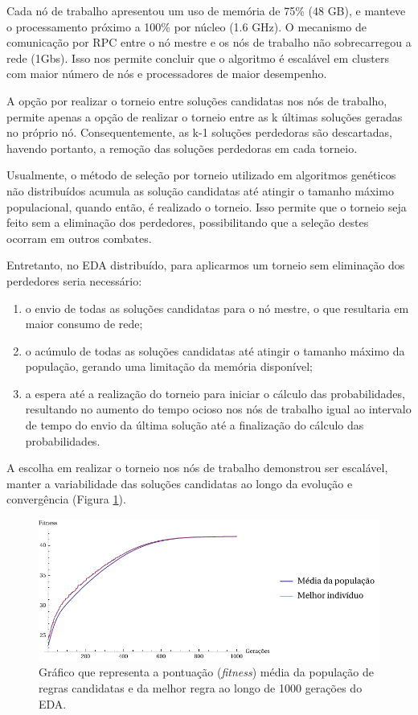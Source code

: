 Cada nó de trabalho apresentou um uso de memória de 75\% (48 GB), e manteve o processamento próximo a 100\% por núcleo (1.6 GHz). O mecanismo de comunicação por RPC entre o nó mestre e os nós de trabalho não sobrecarregou a rede (1Gbs). Isso nos permite concluir que o algoritmo é escalável em clusters com maior número de nós e processadores de maior desempenho.

A opção por realizar o torneio entre soluções candidatas nos nós de trabalho, permite apenas a opção de realizar o torneio entre as k últimas soluções geradas no próprio nó. Consequentemente, as k-1 soluções perdedoras são descartadas, havendo portanto, a remoção das soluções perdedoras em cada torneio. 

Usualmente, o método de seleção por torneio utilizado em algoritmos genéticos não distribuídos acumula as solução candidatas até atingir o tamanho máximo populacional, quando então, é realizado o torneio. Isso permite que o torneio seja feito sem a eliminação dos perdedores, possibilitando que a seleção destes ocorram em outros combates.

Entretanto, no EDA distribuído, para aplicarmos um torneio sem eliminação dos perdedores seria necessário:

\begin{enumerate}
	\item o envio de todas as soluções candidatas para o nó mestre, o que resultaria em maior consumo de rede;
	\item o acúmulo de todas as soluções candidatas até atingir o tamanho máximo da população, gerando uma limitação da memória disponível;
	\item a espera até a realização do torneio para iniciar o cálculo das probabilidades, resultando no aumento do tempo ocioso nos nós de trabalho igual ao intervalo de tempo do envio da última solução até a finalização do cálculo das probabilidades.
\end{enumerate} 

A escolha em realizar o torneio nos nós de trabalho demonstrou ser escalável, manter a variabilidade das soluções candidatas ao longo da evolução e convergência (Figura \ref{fig:evo_eda}).

\begin{figure}
  \centering
  \includegraphics[width=1\textwidth]{figures/evo_Eda.pdf}
  \caption{Gráfico que representa a pontuação (\textit{fitness}) média da população de regras candidatas e da melhor regra ao longo de 1000 gerações do EDA.}
        \label{fig:evo_eda}
\end{figure}

